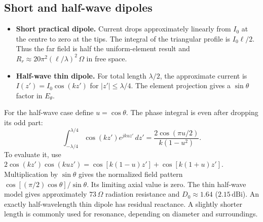 \documentclass[12pt,a4paper]{article}
\begin{document}
\subsection{Short and half-wave dipoles}
\begin{itemize}[leftmargin=*,itemsep=3pt]
\item \textbf{Short practical dipole.} Current drops approximately linearly from $I_0$ at the centre to zero at the tips. The integral of the triangular profile is $I_0\ell/2$. Thus the far field is half the uniform-element result and $R_r\approx20\pi^2(\ell/\lambda)^2\,\Omega$ in free space.
\item \textbf{Half-wave thin dipole.} For total length $\lambda/2$, the approximate current is $I(z')=I_0\cos(kz')$ for $|z'|\le\lambda/4$. The element projection gives a $\sin\theta$ factor in $E_\theta$.
\end{itemize}
For the half-wave case define $u=\cos\theta$. The phase integral is even after dropping its odd part:
\[
 \int_{-\lambda/4}^{\lambda/4}\cos(kz')e^{jkuz'}\,dz'
   =\frac{2\cos(\pi u/2)}{k(1-u^2)}.
\]
To evaluate it, use $2\cos(kz')\cos(kuz')=\cos[k(1-u)z']+\cos[k(1+u)z']$. Multiplication by $\sin\theta$ gives the normalized field pattern $\cos[(\pi/2)\cos\theta]/\sin\theta$. Its limiting axial value is zero. The thin half-wave model gives approximately $73\,\Omega$ radiation resistance and $D_0\approx1.64$ ($2.15\,\mathrm{dBi}$). An exactly half-wavelength thin dipole has residual reactance. A slightly shorter length is commonly used for resonance, depending on diameter and surroundings.
\end{document}
